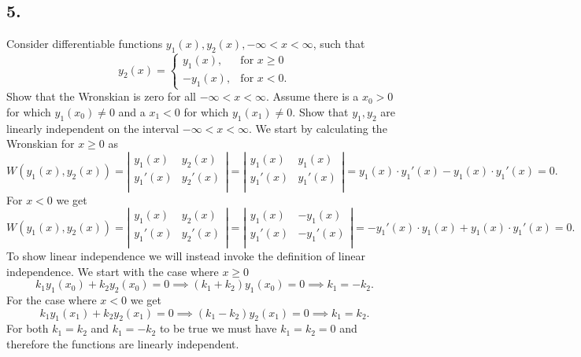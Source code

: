 \subsection*{5.} Consider differentiable functions $y_1(x), y_2(x), -\infty < x <\infty $, such that
\[ 
y_2 (x) = \begin{cases}
y_1 (x), & \text{for } x \geq 0 \\
-y_1(x), & \text{for } x < 0
.\end{cases}
\]
Show that the Wronskian is zero for all $-\infty < x < \infty $. Assume there is a $x_0 > 0$ for which $y_1(x_0) \neq 0$ and a $x_1 < 0$ for which $y_{1}(x_1) \neq 0$. Show that $y_1, y_2$ are linearly independent on the interval $-\infty < x < \infty $.
\bigbreak
We start by calculating the Wronskian for $x \geq 0$ as
\[ 
W(y_1(x), y_2(x)) = \left| \begin{array}{cc}
y_1(x) & y_2(x)\\
y_1'(x) & y_2'(x)\\
\end{array} \right| = \left| \begin{array}{cc}
y_1(x) & y_1(x)\\
y_1'(x) & y_1'(x)\\
\end{array} \right| = y_1(x) \cdot y_1'(x) - y_1(x) \cdot y_1'(x) = 0
.\]
For $x < 0$ we get
\[ 
W(y_1 (x), y_2(x)) = \left| \begin{array}{cc}
y_1(x) & y_2(x)\\
y_1'(x) & y_2'(x)\\
\end{array} \right| = \left| \begin{array}{cc}
y_1(x) & -y_1(x)\\
y_1'(x) & -y_1'(x)\\
\end{array} \right| = -y_1'(x)\cdot y_1(x) + y_1(x) \cdot y_1'(x) = 0
.\]
To show linear independence we will instead invoke the definition of linear independence. We start with the case where $x \geq 0$
\[ 
k_1 y_1(x_0) + k_2 y_2(x_0) = 0 \implies (k_1 + k_2)y_1(x_0) = 0 \implies k_1 = -k_2
.\]
For the case where $x < 0$ we get
\[ 
k_1 y_1(x_1) + k_2 y_2(x_1) = 0 \implies (k_1 - k_2)y_2(x_1) = 0 \implies k_1 = k_2
.\]
For both $k_1 = k_2$ and $k_1 = -k_2$ to be true we must have $k_1 = k_2 = 0$ and therefore the functions are linearly independent.
